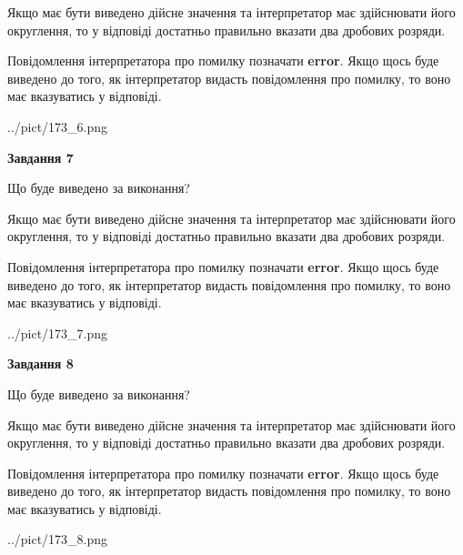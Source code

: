 \documentclass[12pt, ukrainian]{article}
\begin{document}
{\begin {Large}
Якщо має бути виведено дійсне значення та інтерпретатор має здійснювати його округлення, 
то у відповіді достатньо правильно вказати два дробових розряди.

Повідомлення інтерпретатора про помилку позначати \textbf{error}.
Якщо щось буде виведено до того, як інтерпретатор видасть повідомлення про помилку, 
то воно має вказуватись у відповіді. \par

\begin{center}
	{../pict/173_6.png}
\end{center}
\newpage

{\begin {center}\textbf{Завдання 7}\end {center}}\par
Що буде виведено за виконання? \par

Якщо має бути виведено дійсне значення та інтерпретатор має здійснювати його округлення, 
то у відповіді достатньо правильно вказати два дробових розряди.

Повідомлення інтерпретатора про помилку позначати \textbf{error}.
Якщо щось буде виведено до того, як інтерпретатор видасть повідомлення про помилку, 
то воно має вказуватись у відповіді. \par

\begin{center}
	{../pict/173_7.png}
\end{center}
\newpage

{\begin {center}\textbf{Завдання 8}\end {center}}\par
Що буде виведено за виконання? \par

Якщо має бути виведено дійсне значення та інтерпретатор має здійснювати його округлення, 
то у відповіді достатньо правильно вказати два дробових розряди.

Повідомлення інтерпретатора про помилку позначати \textbf{error}.
Якщо щось буде виведено до того, як інтерпретатор видасть повідомлення про помилку, 
то воно має вказуватись у відповіді. \par

\begin{center}
	{../pict/173_8.png}
\end{center}
\newpage


\end{Large}}
\end{document}
